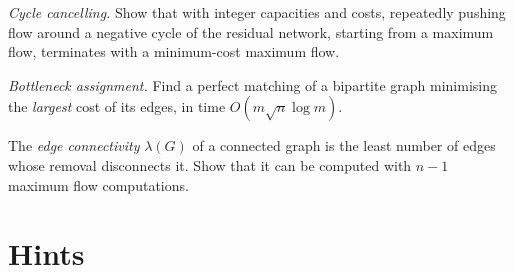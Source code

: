 \begin{exercise}[$\star$]\label{ex:cyclecancel}
\emph{Cycle cancelling.} Show that with integer capacities and costs, repeatedly pushing flow around a negative cycle of the residual network, starting from a maximum flow, terminates with a minimum-cost maximum flow.
\end{exercise}

\begin{exercise}[$\star\star$]\label{ex:bottleneck}
\emph{Bottleneck assignment.} Find a perfect matching of a bipartite graph minimising the \emph{largest} cost of its edges, in time $O(m\sqrt n\log m)$.
\end{exercise}

\begin{exercise}[$\star\star$]\label{ex:edgeconn}
The \emph{edge connectivity} $\lambda(G)$ of a connected graph is the least number of edges whose removal disconnects it. Show that it can be computed with $n-1$ maximum flow computations.
\end{exercise}

\section{Hints}

